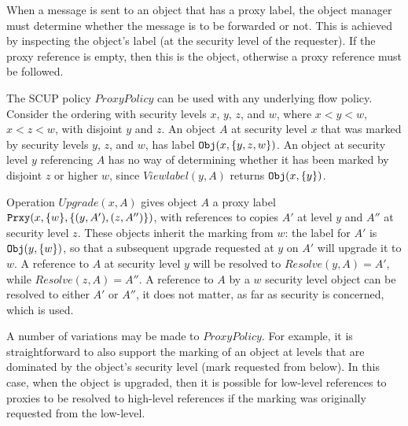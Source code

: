 When a message is sent to an object that has a proxy label, the object
manager must determine whether the message is to be forwarded or not.
This is achieved by inspecting the object's label (at the security level of the
requester). If the proxy reference is empty, then this is the object,
otherwise a proxy reference must be followed.
\begin{center}
\end{center}


\begin{ex}
The SCUP policy $ProxyPolicy$ can be used with any underlying flow policy.
 Consider the ordering with security levels $x$, $y$, $z$, and 
$w$, where $x<y<w$, $x<z<w$, with disjoint $y$ and $z$. 
An object $A$ at security level $x$  that was marked by security levels $y$, $z$, and $w$,
has label $\mbox{\tt Obj}(x,\{y,z,w\})$. An object at security level $y$ referencing
$A$ has no way of determining whether it has been marked by 
disjoint $z$ or higher $w$, since 
$Viewlabel(y,A)$ returns $\mbox{\tt Obj}(x,\{y\})$. 

Operation $Upgrade(x,A)$ gives object $A$ a proxy label
$\mbox{\tt Prxy}(x,\{w\},\{(y,A'),(z,A'')\})$, with references to copies $A'$ at
level $y$ and $A''$ at security level $z$. These objects inherit the marking
from $w$:  the label for $A'$ is $\mbox{\tt Obj}(y,\{w\})$, so that a subsequent
 upgrade requested at $y$ on $A'$ will upgrade it to $w$.
A reference to $A$ at security level $y$ will be resolved to 
$Resolve(y,A)=A'$, while $Resolve(z,A)=A''$. A reference
to $A$ by a $w$ security level object can be resolved to either
$A'$ or $A''$, it does not matter, as far as security is concerned, 
 which is used. 
\end{ex}

A number of variations may be made to $ProxyPolicy$.  For example, it
is straightforward to also support the marking of an object at levels
that are dominated by the object's security level (mark requested from 
below).  In this case, when
the object is upgraded, then it is possible for low-level references to
proxies to be resolved to high-level references if the marking was
originally requested from the low-level.


